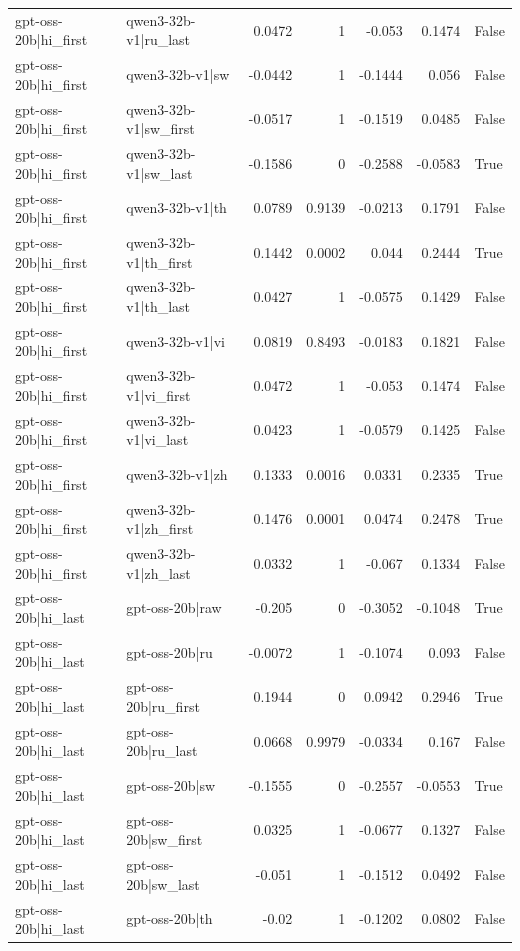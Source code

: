 \begin{table}
\begin{tabular}{l l r r r r l}
gpt-oss-20b|hi_first & qwen3-32b-v1|ru_last & 0.0472 & 1 & -0.053 & 0.1474 & False \\
gpt-oss-20b|hi_first & qwen3-32b-v1|sw & -0.0442 & 1 & -0.1444 & 0.056 & False \\
gpt-oss-20b|hi_first & qwen3-32b-v1|sw_first & -0.0517 & 1 & -0.1519 & 0.0485 & False \\
gpt-oss-20b|hi_first & qwen3-32b-v1|sw_last & -0.1586 & 0 & -0.2588 & -0.0583 & True \\
gpt-oss-20b|hi_first & qwen3-32b-v1|th & 0.0789 & 0.9139 & -0.0213 & 0.1791 & False \\
gpt-oss-20b|hi_first & qwen3-32b-v1|th_first & 0.1442 & 0.0002 & 0.044 & 0.2444 & True \\
gpt-oss-20b|hi_first & qwen3-32b-v1|th_last & 0.0427 & 1 & -0.0575 & 0.1429 & False \\
gpt-oss-20b|hi_first & qwen3-32b-v1|vi & 0.0819 & 0.8493 & -0.0183 & 0.1821 & False \\
gpt-oss-20b|hi_first & qwen3-32b-v1|vi_first & 0.0472 & 1 & -0.053 & 0.1474 & False \\
gpt-oss-20b|hi_first & qwen3-32b-v1|vi_last & 0.0423 & 1 & -0.0579 & 0.1425 & False \\
gpt-oss-20b|hi_first & qwen3-32b-v1|zh & 0.1333 & 0.0016 & 0.0331 & 0.2335 & True \\
gpt-oss-20b|hi_first & qwen3-32b-v1|zh_first & 0.1476 & 0.0001 & 0.0474 & 0.2478 & True \\
gpt-oss-20b|hi_first & qwen3-32b-v1|zh_last & 0.0332 & 1 & -0.067 & 0.1334 & False \\
gpt-oss-20b|hi_last & gpt-oss-20b|raw & -0.205 & 0 & -0.3052 & -0.1048 & True \\
gpt-oss-20b|hi_last & gpt-oss-20b|ru & -0.0072 & 1 & -0.1074 & 0.093 & False \\
gpt-oss-20b|hi_last & gpt-oss-20b|ru_first & 0.1944 & 0 & 0.0942 & 0.2946 & True \\
gpt-oss-20b|hi_last & gpt-oss-20b|ru_last & 0.0668 & 0.9979 & -0.0334 & 0.167 & False \\
gpt-oss-20b|hi_last & gpt-oss-20b|sw & -0.1555 & 0 & -0.2557 & -0.0553 & True \\
gpt-oss-20b|hi_last & gpt-oss-20b|sw_first & 0.0325 & 1 & -0.0677 & 0.1327 & False \\
gpt-oss-20b|hi_last & gpt-oss-20b|sw_last & -0.051 & 1 & -0.1512 & 0.0492 & False \\
gpt-oss-20b|hi_last & gpt-oss-20b|th & -0.02 & 1 & -0.1202 & 0.0802 & False \\

\end{tabular}
\end{table}
